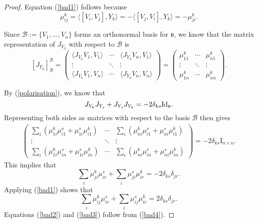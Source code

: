 \documentclass{amsart}
\newcommand{\id}{\text{\normalfont Id}}
\renewcommand{\v}{\mathfrak v}
\theoremstyle{plain}
\theoremstyle{definition}
\theoremstyle{remark}
\begin{document}
 	\begin{proof}
 		Equation (\ref{bad1}) follows because 
 		$$	\mu_{ij}^k = \langle [V_i,V_j], Y_k \rangle = -  \langle [V_j,V_i], Y_k \rangle  = - \mu_{ji}^k.$$
 		
 		Since $\mathcal B := \{V_1,\ldots,V_n\}$ forms an orthonormal basis for $\v$, we know that the matrix representation of $J_{Y_k}$ with respect to $\mathcal B$ is 
 		$$[J_{Y_k}]_{\mathcal B}^{\mathcal B} = 
 		\begin{pmatrix}
 			\langle J_{Y_k}V_1,V_1 \rangle & \cdots&\langle J_{Y_k}V_n,V_1 \rangle \\
 			\vdots &\ddots& \vdots \\
 			\langle J_{Y_k}V_1,V_n \rangle & \cdots&\langle J_{Y_k}V_n,V_n\rangle 
 		\end{pmatrix} 
 		=\begin{pmatrix}
 			\mu_{11}^k & \cdots& \mu_{n1}^k\\
 			\vdots &\ddots& \vdots \\
 			\mu_{1n}^k& \cdots& \mu_{nn}^k
 		\end{pmatrix}.
 		$$
 		
 		By (\ref{polarisation}), we know that 
 		$$J_{Y_k} J_{Y_s} + J_{Y_s} J_{Y_k} = - 2 \delta_{ks} \id_\v.$$
 		Representing both sides as matrices with respect to the basis $\mathcal B$ then gives
 		\begin{align*}
 			\begin{pmatrix}
 				\sum_i (\mu_{1i}^k\mu_{i1}^s + \mu_{1i}^s\mu_{i1}^k) & \cdots& \sum_i (\mu_{ni}^k\mu_{i1}^s + \mu_{ni}^s\mu_{i1}^k) \\
 				\vdots &\ddots& \vdots \\
 				\sum_i (\mu_{1i}^k\mu_{in}^s + \mu_{1i}^s\mu_{in}^k) & \cdots& \sum_i (\mu_{ni}^k\mu_{in}^s + \mu_{ni}^s\mu_{in}^k) 
 			\end{pmatrix}
 			=-2 \delta_{ks} \text{I}_{n \times n}.
 		\end{align*}
 		This implies that 
 		$$\sum_{i} \mu_{ji}^k\mu_{ir}^s +  \sum_i\mu_{ji}^s\mu_{ir}^k = -2 \delta_{ks} \delta_{jr}.$$
 		Applying (\ref{bad1}) shows that 
 		\begin{equation}
 			\label{bad4}
 			\sum_{i} \mu_{ij}^k\mu_{ir}^s +  \sum_i\mu_{ij}^s\mu_{ir}^k = 2 \delta_{ks} \delta_{jr}.
 		\end{equation}
 		Equations (\ref{bad2}) and (\ref{bad3}) follow from  (\ref{bad4}).
 	\end{proof}
	
\end{document}
